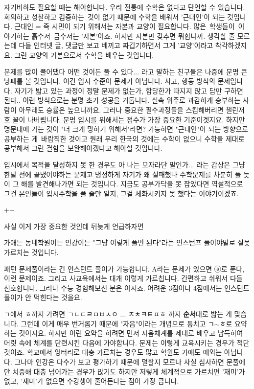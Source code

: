 자기비하도 필요할 때는 해야합니다. 우리 전통에 수학은 없다고 단언할 수 있습니다.
회의하고 성찰하고 검증하는 것이 없기 때문에 수학을 배워서 '근대인'이 되는 것입니다.
근대인 = 즉 시민이 되기 위해서는 자본과 교양이 필요합니다.
많은 학생들이 이야기하는 흙수저 금수저는 '자본'이죠. 하지만 자본만 갖추면 뭐합니까. 생각할 줄 모르는데
다들 인터넷 글, 댓글만 보고 베끼고 짜깁기하면서 그게 '교양'이라고 착각하겠지요.
그런 교양의 기본으로서 수학을 배우는 것입니다.
\vspace{5mm}

문제를 많이 풀어댔다 어떤 것이든 풀 수 있다... 라고 말하는 친구들은 나중에 분명 큰 낭패를 볼 것입니다.
이건 입시 수준이 문제가 아닙니다. 사고, 행동 방식의 문제입니다.
자기가 밟고 있는 과정이 정말 문제가 없는가, 합당한가 따지지 않고 답만 구하면 된다..
이런 방식으로는 분명 초기 성공을 거둡니다. 실속 위주로 과감하게 승부하는 사람이 아무래도 승률은 높으니까요.
그러나 중요한 필수과정들을 스킵해버리면 챌린저호 꼴이 나버립니다.
분명 입시를 위해서는 점수가 가장 중요한 기준이겟지요.
하지만 명문대에 가는 것이 "더 크게 망하기 위해서"라면?
가능하면 "근대인"이 되는 방향으로 공부하는 게 바람직한 것이고
원래 우리 한국의 것에는 수학이 없으니 수학을 제대로 공부해서 그런 결함을 보완해야겠다고 해야할 것입니다.
\vspace{5mm}

입시에서 목적을 달성하지 못 한 경우도 아 나는 모자라단 말인가... 라는 감상은 그냥 한달 전에 끝냈어야하는 문제고
냉정하게 자기가 왜 실패했나 수학문제를 차분히 풀 듯이 그 해를 발견해나가면 되는 것입니다.
지금도 공부가닥을 못 잡았다면 역설적으로 그건 본인들이 입시수학을 풀 줄만 알지, 그걸 체화시키지 못 했다는 이야기이겠죠.
\vspace{5mm}

++
\vspace{5mm}

사실 이게 가장 중요한 것인데 뒤늦게 언급하자면
\vspace{5mm}

가애든 동네학원이든 인강이든
"그냥 이렇게 풀면 된다"라는 인스턴프 풀이야말로 잘못 가르치는 것입니다.
\vspace{5mm}

패턴 문제풀이라는 건 인스턴트 풀이가 가능합니다. A라는 문제가 있으면 ⓐ로 푼다, 이런 문제이죠.
그리고 사교육에서는 대개 이렇게 가르칩니다. 간편하고 쉬워서 다들 선호합니다.
그러나 수능 경험해보신 분은 아시죠. 어려운 3점이나 4점에서는 인스턴트 풀이가 안 먹힌다는 것을요.
\vspace{5mm}

ㄱ에서 ㅎ까지 가려면 ㄱㄴㄷㄹㅁㅂㅅㅇ ... ㅈㅊㅋㅌㅍㅎ 까지 \textbf{순서}대로 밟는 게 맞습니다.
그런데 이게 매우 번거롭기 때문에 "자음"이라는 개념으로 퉁치고 ㄱ$\sim$ㅎ로 요약하는 것이지요.
하지만 이런 요약을 하려면 먼저 자음체계를 제대로 배우고 납득하여 머릿 속에 체계를 단련시킨 다음에 가야합니다.
문제는 이렇게 교육시키는 경우가 적단 것이죠. 학교에서 엉터리로 대충 가르치는 경우도 많고 학원도 가애도 예외는 아닙니다.
그나마 인강은 다수가 보고 평가하기 때문에 덜할지 모르나 사실 심사하면 문풀에만 치중해 대충 넘어가는 경우가 많기도 하지만
저렇게 체계적으로 가르치면 '재미'가 없고, '재미'가 없으면 수강생이 줄어든다는 점이 가장 큽니다.
\vspace{5mm}

